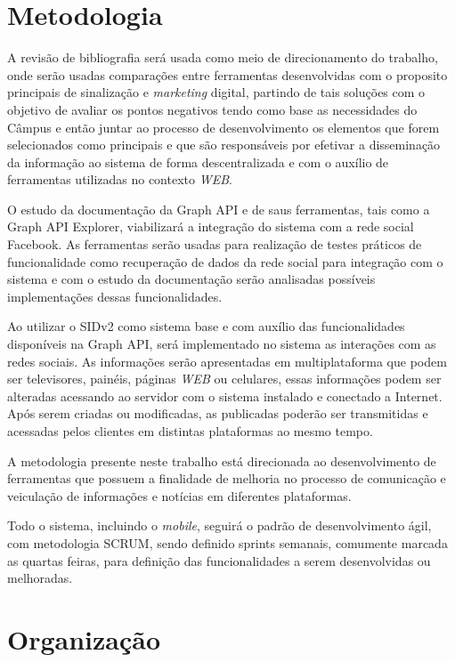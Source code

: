 \section{Metodologia}
A revisão de bibliografia será usada como meio de direcionamento do trabalho, onde serão usadas comparações entre ferramentas desenvolvidas com o proposito principais de sinalização e \textit{marketing} digital, partindo de tais soluções com o objetivo de avaliar os pontos negativos tendo como base as necessidades do Câmpus e então juntar ao processo de desenvolvimento os elementos que forem selecionados como principais e que são responsáveis por efetivar a disseminação da informação ao sistema de forma descentralizada e com o auxílio de ferramentas utilizadas no contexto \textit{WEB}.

O estudo da documentação da Graph API e de saus ferramentas, tais como a Graph API Explorer, viabilizará a integração do sistema com a rede social Facebook. As ferramentas serão usadas para realização de testes práticos de funcionalidade como recuperação de dados da rede social para integração com o sistema e com o estudo da documentação serão analisadas possíveis implementações dessas funcionalidades.
	 
Ao utilizar o SIDv2 como sistema base e com auxílio das funcionalidades disponíveis na Graph API, será implementado no sistema as interações com as redes sociais. As informações serão apresentadas em multiplataforma que podem ser televisores, painéis, páginas \textit{WEB} ou celulares, essas informações podem ser alteradas acessando ao servidor com o sistema instalado e conectado a Internet. Após serem criadas ou modificadas, as publicadas poderão ser transmitidas e acessadas pelos clientes em distintas plataformas ao mesmo tempo.

A metodologia presente neste trabalho está direcionada ao desenvolvimento de ferramentas que possuem a finalidade de melhoria no processo de comunicação e veiculação de informações e notícias em diferentes plataformas. 

Todo o sistema, incluindo o \textit{mobile}, seguirá o padrão de desenvolvimento ágil, com metodologia SCRUM, sendo definido sprints semanais, comumente marcada as quartas feiras, para definição das funcionalidades a serem desenvolvidas ou melhoradas. 

\section{Organização}

